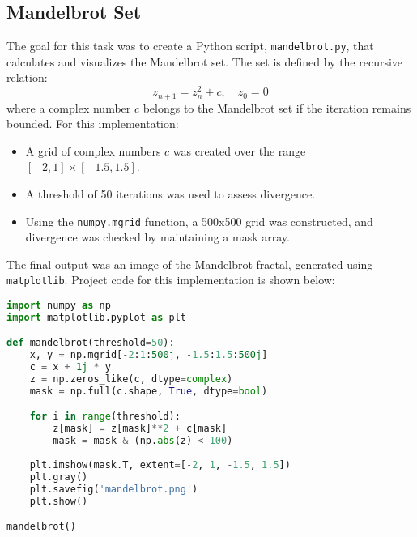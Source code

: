\documentclass{article}
\begin{document}
\subsection{Mandelbrot Set}
The goal for this task was to create a Python script, \texttt{mandelbrot.py}, that calculates and visualizes the Mandelbrot set. The set is defined by the recursive relation:
\[
z_{n+1} = z_n^2 + c, \quad z_0 = 0
\]
where a complex number \(c\) belongs to the Mandelbrot set if the iteration remains bounded. For this implementation:
\begin{itemize}
    \item A grid of complex numbers \(c\) was created over the range \([-2, 1] \times [-1.5, 1.5]\).
    \item A threshold of 50 iterations was used to assess divergence.
    \item Using the \texttt{numpy.mgrid} function, a 500x500 grid was constructed, and divergence was checked by maintaining a mask array.
\end{itemize}
The final output was an image of the Mandelbrot fractal, generated using \texttt{matplotlib}. Project code for this implementation is shown below:
\begin{lstlisting}[language=Python]
import numpy as np
import matplotlib.pyplot as plt

def mandelbrot(threshold=50):
    x, y = np.mgrid[-2:1:500j, -1.5:1.5:500j]
    c = x + 1j * y
    z = np.zeros_like(c, dtype=complex)
    mask = np.full(c.shape, True, dtype=bool)

    for i in range(threshold):
        z[mask] = z[mask]**2 + c[mask]
        mask = mask & (np.abs(z) < 100)
    
    plt.imshow(mask.T, extent=[-2, 1, -1.5, 1.5])
    plt.gray()
    plt.savefig('mandelbrot.png')
    plt.show()

mandelbrot()
\end{lstlisting}
\end{document}
